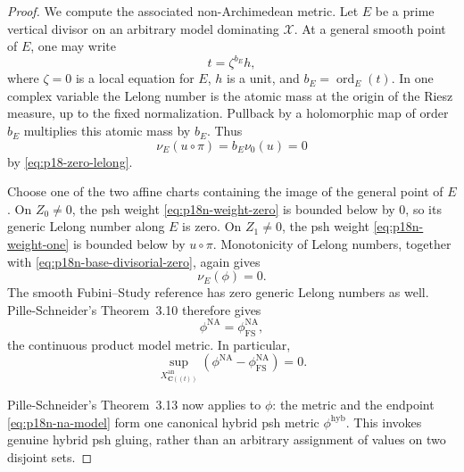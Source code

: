 \begin{proof}
We compute the associated non-Archimedean metric.  Let \(E\) be a prime
vertical divisor on an arbitrary model dominating \(\mathcal X\).  At a
general smooth point of \(E\), one may write
\[
                          t=\zeta^{b_E}h,
\]
where \(\zeta=0\) is a local equation for \(E\), \(h\) is a unit, and
\(b_E=\operatorname{ord}_E(t)\).  In one complex variable the Lelong
number is the atomic mass at the origin of the Riesz measure, up to the
fixed normalization.  Pullback by a holomorphic map of order \(b_E\)
multiplies this atomic mass by \(b_E\).  Thus
\[
                 \nu_E(u\circ\pi)
                 =b_E\nu_0(u)=0
\tag{17}\label{eq:p18n-base-divisorial-zero}
\]
by \eqref{eq:p18-zero-lelong}.

Choose one of the two affine charts containing the image of the general
point of \(E\).  On \(Z_0\ne0\), the psh weight
\eqref{eq:p18n-weight-zero} is bounded below by \(0\), so its generic
Lelong number along \(E\) is zero.  On \(Z_1\ne0\), the psh weight
\eqref{eq:p18n-weight-one} is bounded below by \(u\circ\pi\).
Monotonicity of Lelong numbers, together with
\eqref{eq:p18n-base-divisorial-zero}, again gives
\[
                         \nu_E(\phi)=0.
\tag{18}\label{eq:p18n-metric-divisorial-zero}
\]
The smooth Fubini--Study reference has zero generic Lelong numbers as
well.  Pille-Schneider's Theorem~3.10 therefore gives
\[
                  \phi^{\mathrm{NA}}
                  =\phi_{\mathrm{FS}}^{\mathrm{NA}},
\tag{19}\label{eq:p18n-na-model}
\]
the continuous product model metric.  In particular,
\[
 \sup_{X_{\mathbf C((t))}^{\mathrm{an}}}
 (\phi^{\mathrm{NA}}-\phi_{\mathrm{FS}}^{\mathrm{NA}})=0.
\tag{20}\label{eq:p18n-na-normalization}
\]

Pille-Schneider's Theorem~3.13 now applies to \(\phi\): the metric and
the endpoint \eqref{eq:p18n-na-model} form one canonical hybrid psh
metric \(\phi^{\mathrm{hyb}}\).  This invokes genuine hybrid psh
gluing, rather than an arbitrary assignment of values on two disjoint
sets.


\end{proof}
